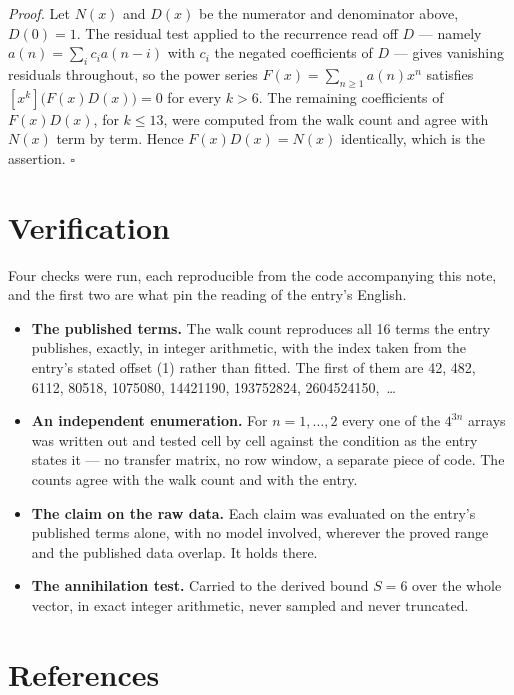\documentclass[11pt]{article}
\theoremstyle{definition}
\begin{document}
{\itshape Proof.} Let $N(x)$ and $D(x)$ be the numerator and denominator above, $D(0)=1$. The residual test applied to the recurrence read off $D$ --- namely $a(n) = \sum_i c_i a(n-i)$ with $c_i$ the negated coefficients of $D$ --- gives vanishing residuals throughout, so the power series $F(x)=\sum_{n\ge 1}a(n)x^n$ satisfies $[x^k]\bigl(F(x)D(x)\bigr) = 0$ for every $k > 6$. The remaining coefficients of $F(x)D(x)$, for $k \le 13$, were computed from the walk count and agree with $N(x)$ term by term. Hence $F(x)D(x) = N(x)$ identically, which is the assertion. $\square$

\section{Verification}

Four checks were run, each reproducible from the code accompanying this note, and the first two are what pin the reading of the entry's English.

\begin{itemize}

\item {\bfseries The published terms.} The walk count reproduces all 16 terms the entry publishes, exactly, in integer arithmetic, with the index taken from the entry's stated offset (1) rather than fitted. The first of them are 42, 482, 6112, 80518, 1075080, 14421190, 193752824, 2604524150,~\dots

\item {\bfseries An independent enumeration.} For $n = 1,\dots,2$ every one of the $4^{3n}$ arrays was written out and tested cell by cell against the condition as the entry states it --- no transfer matrix, no row window, a separate piece of code. The counts agree with the walk count and with the entry.

\item {\bfseries The claim on the raw data.} Each claim was evaluated on the entry's published terms alone, with no model involved, wherever the proved range and the published data overlap. It holds there.

\item {\bfseries The annihilation test.} Carried to the derived bound $S = 6$ over the whole vector, in exact integer arithmetic, never sampled and never truncated.

\end{itemize}

\section{References}
\end{document}
